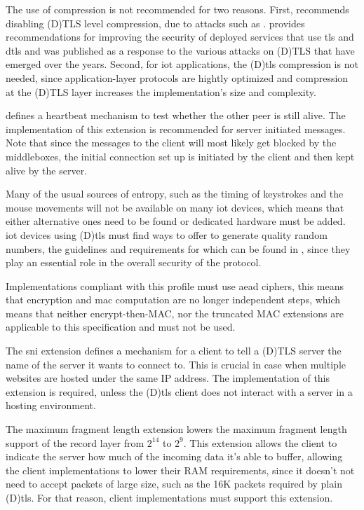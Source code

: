 \documentclass{llncs}
\begin{document}
The use of compression is not recommended for two reasons. First, \cite{RFC7525}
recommends disabling (D)TLS level compression, due to attacks such as \cite{Microsof72:online}.
 provides recommendations for improving the security of deployed services
that use \gls{tls} and \gls{dtls} and was published as a response to the various
attacks on (D)TLS that have emerged over the years. Second, for \gls{iot} applications,
the (D)\gls{tls} compression is not needed, since application-layer protocols are hightly
optimized and compression at the (D)TLS layer increases the implementation's size and complexity.

 defines a heartbeat mechanism to test whether the other peer
is still alive. The implementation of this extension is recommended for server
initiated messages. Note that since the messages to the client will most likely
get blocked by the middleboxes, the initial connection set up is initiated by the
client and then kept alive by the server.

Many of the usual sources of entropy, such as the timing of keystrokes and the
mouse movements will not be available on many \gls{iot} devices, which means that
either alternative ones need to be found or dedicated hardware must be added.
\gls{iot} devices using (D)\gls{tls} must find ways to offer to generate quality
random numbers, the guidelines and requirements for which can be found in \cite{rfc4086},
since they play an essential role in the overall security of the protocol.

Implementations compliant with this profile must use \gls{aead} ciphers, this means
that encryption and \gls{mac} computation are no longer independent steps, which means
that neither encrypt-then-MAC\cite{RFC7366}, nor the truncated MAC\cite{RFC6066} extensions are applicable
to this specification and must not be used.

The \gls{sni} extension\cite{RFC6066} defines a mechanism for a client to
tell a (D)TLS server the name of the server it wants to connect to. This is
crucial in case when multiple websites are hosted under the same IP address.
The implementation of this extension is required, unless the (D)\gls{tls}
client does not interact with a server in a hosting environment.

The maximum fragment length extension\cite{RFC6066} lowers the maximum fragment
length support of the record layer from $2^14$ to $2^9$. This extension allows
the client to indicate the server how much of the incoming data it's able to buffer,
allowing the client implementations to lower their RAM requirements, since it doesn't
not need to accept packets of large size, such as the 16K packets required by
plain (D)\gls{tls}. For that reason, client implementations must support this
extension.
\end{document}
